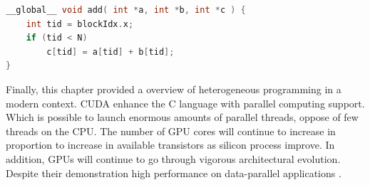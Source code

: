 \begin{lstlisting}[language=C++, label={lst:gpu}, caption={GPU parallel capabilities}]
__global__ void add( int *a, int *b, int *c ) {
	int tid = blockIdx.x;
 	if (tid < N)
 		c[tid] = a[tid] + b[tid];
}
\end{lstlisting}






Finally, this chapter provided a overview of heterogeneous programming in a modern context. CUDA  enhance the C language with parallel computing support. Which is possible to launch  enormous amounts of parallel threads, oppose of few threads on the CPU. The number of GPU cores will continue to increase in proportion to increase in available transistors as silicon process improve. In addition, GPUs will continue to go through vigorous architectural evolution. Despite their demonstration high performance on data-parallel applications \cite{hwu}.







